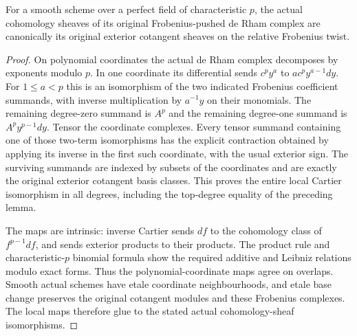 \begin{lemma}
\label{lem:vanishing-cartier-smooth-complex}
\notready
For a smooth scheme over a perfect field of characteristic $p$, the actual
cohomology sheaves of its original Frobenius-pushed de Rham complex are
canonically its original exterior cotangent sheaves on the relative
Frobenius twist.
\end{lemma}
\begin{proof}
On polynomial coordinates the actual de Rham complex decomposes by
exponents modulo $p$. In one coordinate its differential sends
$c^py^a$ to $a c^py^{a-1}dy$. For $1\le a<p$ this is an isomorphism of the
two indicated Frobenius coefficient summands, with inverse multiplication
by $a^{-1}y$ on their monomials. The remaining degree-zero summand is
$A^p$ and the remaining degree-one summand is
$A^p y^{p-1}dy$. Tensor the coordinate complexes. Every tensor summand
containing one of those two-term isomorphisms has the explicit contraction
obtained by applying its inverse in the first such coordinate, with the
usual exterior sign. The surviving summands are indexed by subsets of
the coordinates and are exactly the original exterior cotangent basis
classes. This proves the entire local Cartier isomorphism in all degrees,
including the top-degree equality of the preceding lemma.

The maps are intrinsic: inverse Cartier sends $df$ to the cohomology class
of $f^{p-1}df$, and sends exterior products to their products. The product
rule and characteristic-$p$ binomial formula show the required additive
and Leibniz relations modulo exact forms. Thus the polynomial-coordinate
maps agree on overlaps. Smooth actual schemes have etale coordinate
neighbourhoods, and etale base change preserves the original cotangent
modules and these Frobenius complexes. The local maps therefore glue to
the stated actual cohomology-sheaf isomorphisms.
\end{proof}

